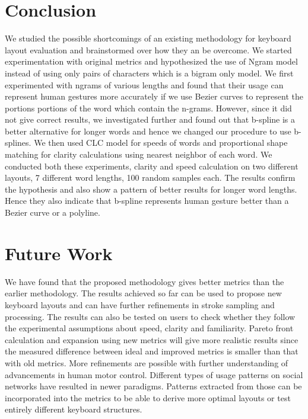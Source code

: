 \documentclass[MTech]{iitmdiss}
\begin{document}
\chapter{Conclusion}
We studied the possible shortcomings of an existing methodology for keyboard layout evaluation and brainstormed over how they an be overcome. We started experimentation with original metrics and hypothesized the use of Ngram model instead of using only pairs of characters which is a bigram only model. We first experimented with ngrams of various lengths and found that their usage can represent human gestures more accurately if we use Bezier curves to represent the portions portions of the word which contain the n-grams. However, since it did not give correct results, we investigated further and found out that b-spline is a better alternative for longer words and hence we changed our procedure to use b-splines. We then used CLC model for speeds of words and proportional shape matching for clarity calculations using nearest neighbor of each word. We conducted both these experiments, clarity and speed calculation on two different layouts, 7 different word lengths, 100 random samples each. The results confirm the hypothesis and also show a pattern of better results for longer word lengths. Hence they also indicate that b-spline represents human gesture better than a Bezier curve or a polyline.

\chapter{Future Work}
We have found that the proposed methodology gives better metrics than the earlier methodology. The results achieved so far can be used to propose new keyboard layouts and can have further refinements in stroke sampling and processing. The results can also be tested on users to check whether they follow the experimental assumptions about speed, clarity and familiarity. Pareto front calculation and expansion using new metrics will give more realistic results since the measured difference between ideal and improved metrics is smaller than that with old metrics. More refinements are possible with further understanding of advancements in human motor control.
Different types of usage patterns on social networks have resulted in newer paradigms. Patterns extracted from those can be incorporated into the metrics to be able to derive more optimal layouts or test entirely different keyboard structures.


\begin{singlespace}
%	
	
\end{singlespace}
\end{document}
